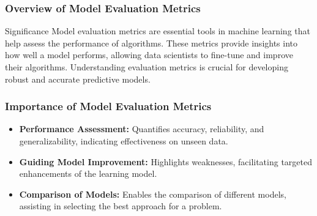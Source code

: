 \documentclass[aspectratio=169]{beamer}
\begin{document}
\frame{\titlepage}

\begin{frame}[fragile]
    \titlepage
\end{frame}

\begin{frame}[fragile]
    \frametitle{Overview of Model Evaluation Metrics}
    \begin{block}{Significance}
        Model evaluation metrics are essential tools in machine learning that help assess the performance of algorithms. These metrics provide insights into how well a model performs, allowing data scientists to fine-tune and improve their algorithms. Understanding evaluation metrics is crucial for developing robust and accurate predictive models.
    \end{block}
\end{frame}

\begin{frame}[fragile]
    \frametitle{Importance of Model Evaluation Metrics}
    \begin{itemize}
        \item \textbf{Performance Assessment:} Quantifies accuracy, reliability, and generalizability, indicating effectiveness on unseen data.
        \item \textbf{Guiding Model Improvement:} Highlights weaknesses, facilitating targeted enhancements of the learning model.
        \item \textbf{Comparison of Models:} Enables the comparison of different models, assisting in selecting the best approach for a problem.
    \end{itemize}
\end{frame}
\end{document}
